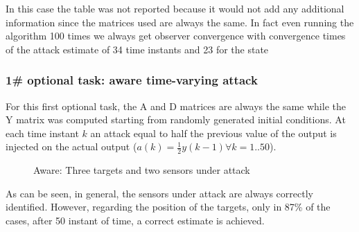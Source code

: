     \noindent
    In this case the table was not reported because it would not add any additional information since the matrices used are always the same. In fact even running the algorithm 100 times we always get observer convergence with convergence times of the attack estimate of 34 time instants and 23 for the state

    
    \newpage
    \subsubsection*{1\# optional task: aware time-varying attack}
    For this first optional task, the A and D matrices are always the same while the Y matrix was computed starting from randomly generated initial conditions. At each time instant $k$ an attack equal to half the previous value of the output is injected on the actual output ($a(k)= \frac{1}{2}y(k-1) \forall k=1..50$). 
      \begin{figure}[h]
    \centering
    \caption{Aware: Three targets and two sensors under attack}
    \end{figure}
    
\noindent
As can be seen, in general, the sensors under attack are always correctly identified. However, regarding the position of the targets, only in 87\% of the cases, after 50 instant of time, a correct estimate is achieved.
    
